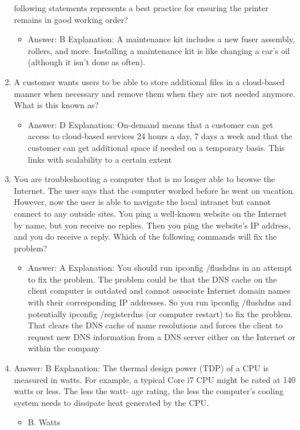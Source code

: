 \documentclass{article}
\begin{document}
\begin{enumerate}
following statements represents a best practice for ensuring the
printer remains in good working order?
    \begin{itemize}
        \item Answer: B
Explanation: A maintenance kit includes a new fuser assembly, rollers, and more.
Installing a maintenance kit is like changing a car’s oil (although it isn’t done as often).
    \end{itemize}
    \item A customer wants users to be able to store additional files in a
cloud-based manner when necessary and remove them when they
are not needed anymore. What is this known as?
    \begin{itemize}
        \item Answer: D
Explanation: On-demand means that a customer can get access to cloud-based services
24 hours a day, 7 days a week and that the customer can get additional space if
needed on a temporary basis. This links with scalability to a certain extent
    \end{itemize}
    \item You are troubleshooting a computer that is no longer able to
browse the Internet. The user says that the computer worked
before he went on vacation. However, now the user is able to
navigate the local intranet but cannot connect to any outside sites.
You ping a well-known website on the Internet by name, but you
receive no replies. Then you ping the website’s IP address, and you
do receive a reply. Which of the following commands will fix the
problem?
    \begin{itemize}
        \item Answer: A
Explanation: You should run ipconfig /flushdns in an attempt to fix the problem. The
problem could be that the DNS cache on the client computer is outdated and cannot
associate Internet domain names with their corresponding IP addresses. So you run
ipconfig /flushdns and potentially ipconfig /registerdns (or computer restart) to fix
the problem. That clears the DNS cache of name resolutions and forces the client to
request new DNS information from a DNS server either on the Internet or within the
company
    \end{itemize}
    \item Answer: B
Explanation: The thermal design power (TDP) of a CPU is measured in watts. For
example, a typical Core i7 CPU might be rated at 140 watts or less. The less the watt-
age rating, the less the computer’s cooling system needs to dissipate heat generated
by the CPU.
    \begin{itemize}
        \item B. Watts
    \end{itemize}
\end{enumerate}
\end{document}
